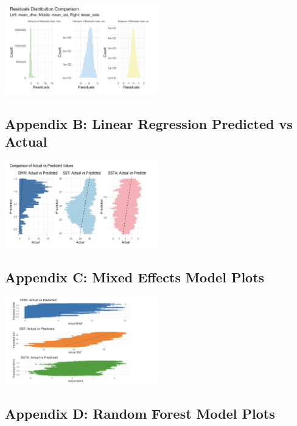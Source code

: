 \documentclass[letterpaper,9pt,twocolumn,twoside,]{pinp}
\begin{document}
\begin{center}
\includegraphics[width=0.5\textwidth]{report_images/lr_reshist.png}
\end{center}

\subsection{Appendix B: Linear Regression Predicted vs
Actual}\label{appendix-b-linear-regression-predicted-vs-actual}

\begin{center}
\includegraphics[width=0.5\textwidth]{report_images/lr_graph.png}
\end{center}

\subsection{Appendix C: Mixed Effects Model
Plots}\label{appendix-c-mixed-effects-model-plots}

\begin{center}
\includegraphics[width=0.5\textwidth]{report_images/mem_plot.png}
\end{center}

\subsection{Appendix D: Random Forest Model
Plots}\label{appendix-d-random-forest-model-plots}
\end{document}
